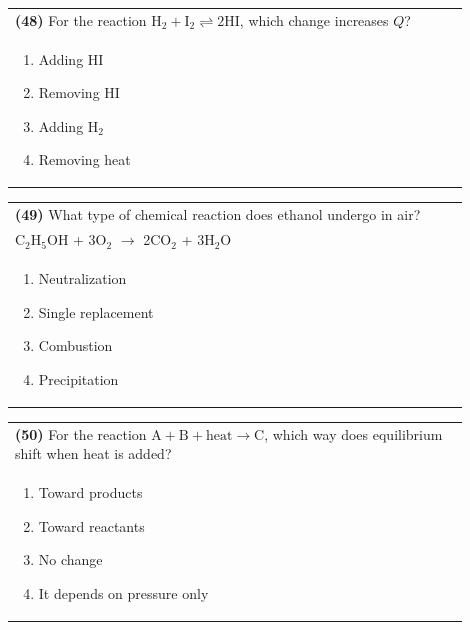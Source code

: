 \documentclass{article}
\begin{document}
\noindent\begin{tabular}{|p{0.9\linewidth}|}
\hline
\textbf{(48)} For the reaction $\text{H}_2 + \text{I}_2 \rightleftharpoons 2\text{HI}$, which change increases $Q$?\\[0.2cm]
\begin{minipage}[t]{0.85\linewidth}
\begin{enumerate}[label=\alph*.]
\item Adding HI
\item Removing HI
\item Adding H$_2$
\item Removing heat
\end{enumerate}
\end{minipage}\\[0.2cm]
\hline
\end{tabular}
\newpage

\noindent\begin{tabular}{|p{0.9\linewidth}|}
\hline
\textbf{(49)} What type of chemical reaction does ethanol undergo in air?\\[0.2cm]
C$_2$H$_5$OH + 3O$_2$ $\rightarrow$ 2CO$_2$ + 3H$_2$O\\[0.2cm]
\begin{minipage}[t]{0.85\linewidth}
\begin{enumerate}[label=\alph*.]
\item Neutralization
\item Single replacement
\item Combustion
\item Precipitation
\end{enumerate}
\end{minipage}\\[0.2cm]
\hline
\end{tabular}

\noindent\begin{tabular}{|p{0.9\linewidth}|}
\hline
\textbf{(50)} For the reaction $\text{A} + \text{B} + \text{heat} \rightarrow \text{C}$, which way does equilibrium shift when heat is added?\\[0.2cm]
\begin{minipage}[t]{0.85\linewidth}
\begin{enumerate}[label=\alph*.]
\item Toward products
\item Toward reactants
\item No change
\item It depends on pressure only
\end{enumerate}
\end{minipage}\\[0.2cm]
\hline
\end{tabular}
\end{document}
